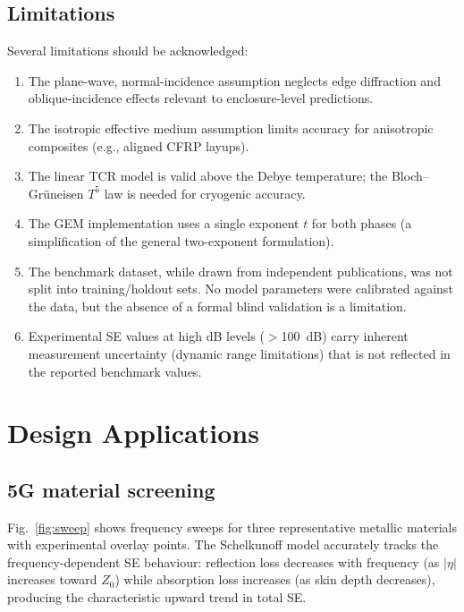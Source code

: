 \documentclass[review,3p,authoryear]{elsarticle}
\begin{document}
\subsection{Limitations}
\label{sec:limitations}

Several limitations should be acknowledged:

\begin{enumerate}
\item The plane-wave, normal-incidence assumption neglects edge diffraction and oblique-incidence effects relevant to enclosure-level predictions.
\item The isotropic effective medium assumption limits accuracy for anisotropic composites (e.g., aligned CFRP layups).
\item The linear TCR model is valid above the Debye temperature; the Bloch--Gr\"uneisen $T^5$ law is needed for cryogenic accuracy.
\item The GEM implementation uses a single exponent $t$ for both phases (a simplification of the general two-exponent formulation).
\item The benchmark dataset, while drawn from independent publications, was not split into training/holdout sets. No model parameters were calibrated against the data, but the absence of a formal blind validation is a limitation.
\item Experimental SE values at high dB levels ($>$\SI{100}{dB}) carry inherent measurement uncertainty (dynamic range limitations) that is not reflected in the reported benchmark values.
\end{enumerate}

\section{Design Applications}
\label{sec:applications}

\subsection{5G material screening}

Fig.~\ref{fig:sweep} shows frequency sweeps for three representative metallic materials with experimental overlay points. The Schelkunoff model accurately tracks the frequency-dependent SE behaviour: reflection loss decreases with frequency (as $|\eta|$ increases toward $Z_0$) while absorption loss increases (as skin depth decreases), producing the characteristic upward trend in total SE.
\end{document}
